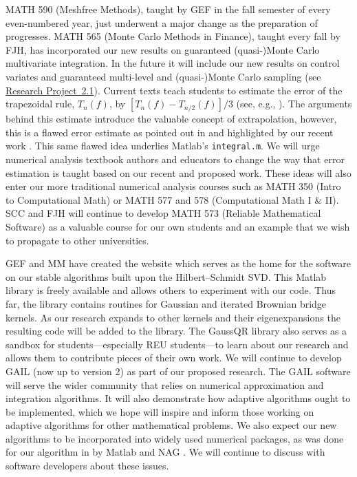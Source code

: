 \documentclass[11pt]{NSFamsart}
\newcommand{\Matlab}{{\sc Matlab}\xspace}
\newcommand{\refprobba}{\hyperref[Integrationsubsec]{Research Project~2.1}\xspace}
\begin{document}
\begin{description}[leftmargin=0ex]
\item[Refreshing Course Syllabi]
MATH 590 (Meshfree Methods), taught by GEF in the fall semester of every even-numbered year, just underwent a major change as the preparation of \citep{FMcC15} progresses.
MATH 565 (Monte Carlo Methods in Finance), taught every fall by FJH, has incorporated our new results on guaranteed (quasi-)Monte Carlo multivariate integration. In the future it will include our new results on control variates and guaranteed multi-level and (quasi-)Monte Carlo sampling (see \refprobba).
Current texts teach students to estimate the error of the trapezoidal rule, $T_n(f)$, by $[T_n(f)-T_{n/2}(f)]/3$ (see, e.g., \cite[pp.\ 223--224]{BurFai10}).  The arguments behind this estimate introduce the valuable concept of extrapolation, however, this is a flawed error estimate as pointed out in \cite{Lyn83} and highlighted by our recent work \cite{HicEtal14b}.  This same flawed idea underlies \Matlab's {\tt integral.m}.  We will urge numerical analysis textbook authors and educators to change the way that error estimation is taught based on our recent and proposed work.  These ideas will also enter our more traditional numerical analysis courses such as MATH 350 (Intro to Computational Math) or MATH 577 and 578 (Computational Math I \& II).  SCC and FJH will continue to develop MATH 573 (Reliable Mathematical Software) as a valuable course for our own students and an example that we wish to propagate to other universities.

\item[Creating Software and Collaborating with Software Developers]
GEF and MM have created the website \citep{McCFBG13} which serves as the home for the software on our stable algorithms built upon the Hilbert--Schmidt SVD. This \Matlab library is freely available and allows others to experiment with our code. Thus far, the library contains routines for Gaussian and iterated Brownian bridge kernels. As our research expands to other kernels and their eigenexpansions the resulting code will be added to the library. The GaussQR library also serves as a sandbox for students---especially REU students---to learn about our research and allows them to contribute pieces of their own work.
We will continue to develop GAIL \citep{ChoEtal14a} (now up to version 2) as part of our proposed research.  The GAIL software will serve the wider community that relies on numerical approximation and integration algorithms.  It will also demonstrate how adaptive algorithms ought to be implemented, which we hope will inspire and inform those working on adaptive algorithms for other mathematical problems.  We also expect our new algorithms to be incorporated into widely used numerical packages, as was done for our algorithm in \cite{HonHic00a} by \Matlab \citep{MAT8.4} and NAG \citep{NAG23}.  We will continue to discuss with software developers about these issues.


\end{description}
\end{document}
